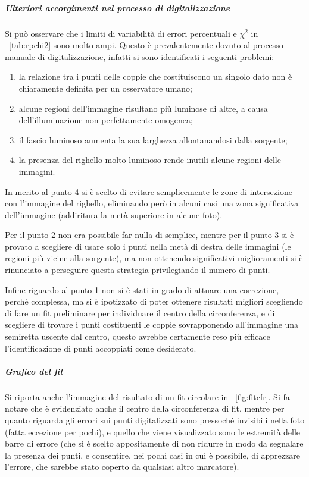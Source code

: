 \documentclass[10pt,a4paper]{article}
\begin{document}
\subparagraph{Ulteriori accorgimenti nel processo di digitalizzazione} Si può osservare che i limiti di variabilità di errori percentuali e $\chi^2$ in \tablename{~\ref{tab:rpchi2}} sono molto ampi. Questo è prevalentemente dovuto al processo manuale di digitalizzazione, infatti si sono identificati i seguenti problemi:
\begin{enumerate}
	\item la relazione tra i punti delle coppie che costituiscono un singolo dato non è chiaramente definita per un osservatore umano;
	\item alcune regioni dell'immagine risultano più luminose di altre, a causa dell'illuminazione non perfettamente omogenea;
	\item il fascio luminoso aumenta la sua larghezza allontanandosi dalla sorgente;
	\item la presenza del righello molto luminoso rende inutili alcune regioni delle immagini.
\end{enumerate}

In merito al punto 4 si è scelto di evitare semplicemente le zone di intersezione con l'immagine del righello, eliminando però in alcuni casi una zona significativa dell'immagine (addiritura la metà superiore in alcune foto).

Per il punto 2 non era possibile far nulla di semplice, mentre per il punto 3 si è provato a scegliere di usare solo i punti nella metà di destra delle immagini (le regioni più vicine alla sorgente), ma non ottenendo significativi miglioramenti si è rinunciato a perseguire questa strategia privilegiando il numero di punti.

Infine riguardo al punto 1 non si è stati in grado di attuare una correzione, perché complessa, ma si è ipotizzato di poter ottenere risultati migliori scegliendo di fare un fit preliminare per individuare il centro della circonferenza, e di scegliere di trovare i punti costituenti le coppie sovrapponendo all'immagine una semiretta uscente dal centro, questo avrebbe certamente reso più efficace l'identificazione di punti accoppiati come desiderato.


\subparagraph{Grafico del fit}Si riporta anche l'immagine del risultato di un fit circolare in \figurename{~\ref{fig:fitcfr}}. Si fa notare che è evidenziato anche il centro della circonferenza di fit, mentre per quanto riguarda gli errori sui punti digitalizzati sono pressoché invisibili nella foto (fatta eccezione per pochi), e quello che viene visualizzato sono le estremità delle barre di errore (che si è scelto appositamente di non ridurre in modo da segnalare la presenza dei punti, e consentire, nei pochi casi in cui è possibile, di apprezzare l'errore, che sarebbe stato coperto da qualsiasi altro marcatore).
\end{document}
